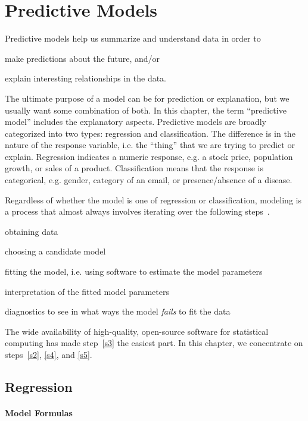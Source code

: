 \chapter{Predictive Models}
Predictive models help us summarize and understand data in order to
\begin{inparaenum}[1)] \item
make predictions about the future, and/or \item explain interesting
relationships in the data. 
\end{inparaenum}
The ultimate purpose of a model can be for prediction or explanation,
but we usually want some combination of both. In this chapter, the
term ``predictive model'' includes the explanatory aspects.
Predictive models are broadly categorized into two types: regression
and classification.  The difference is in the nature of the response
variable, i.e.  the ``thing'' that we are trying to predict or
explain.  Regression indicates a numeric response, e.g. a stock price,
population growth, or sales of a product. Classification means that
the response is categorical, e.g. gender, category of an email, or
presence/absence of a disease.

Regardless of whether the model is one of regression or classification, 
modeling is a process that almost always involves iterating
over the following steps~\cite{chambers:1992}.
\begin{compactenum}
\item obtaining data \label{s1}
\item choosing a candidate model  \label{s2}
\item fitting the model, i.e. using software to  estimate the model parameters \label{s3}
\item interpretation of the fitted model parameters \label{s4}
\item diagnostics to see in what ways the model \emph{fails} to fit the data \label{s5}
\end{compactenum}
The wide availability of high-quality, open-source software for
statistical computing has made step~\ref{s3} the easiest part. In this
chapter, we concentrate on steps~\ref{s2}, \ref{s4}, and \ref{s5}.

\section{Regression}

\subsubsection*{Model Formulas}

